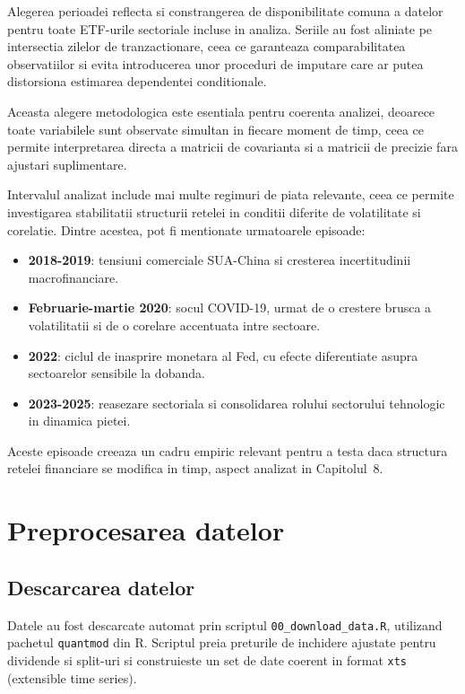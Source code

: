 Alegerea perioadei reflecta si constrangerea de disponibilitate comuna a datelor pentru toate ETF-urile sectoriale incluse in analiza. Seriile au fost aliniate pe intersectia zilelor de tranzactionare, ceea ce garanteaza comparabilitatea observatiilor si evita introducerea unor proceduri de imputare care ar putea distorsiona estimarea dependentei conditionale.

Aceasta alegere metodologica este esentiala pentru coerenta analizei, deoarece toate variabilele sunt observate simultan in fiecare moment de timp, ceea ce permite interpretarea directa a matricii de covarianta si a matricii de precizie fara ajustari suplimentare.

Intervalul analizat include mai multe regimuri de piata relevante, ceea ce permite investigarea stabilitatii structurii retelei in conditii diferite de volatilitate si corelatie. Dintre acestea, pot fi mentionate urmatoarele episoade:

\begin{itemize}
    \item \textbf{2018-2019}: tensiuni comerciale SUA-China si cresterea incertitudinii macrofinanciare.
    \item \textbf{Februarie-martie 2020}: socul COVID-19, urmat de o crestere brusca a volatilitatii si de o corelare accentuata intre sectoare.
    \item \textbf{2022}: ciclul de inasprire monetara al Fed, cu efecte diferentiate asupra sectoarelor sensibile la dobanda.
    \item \textbf{2023-2025}: reasezare sectoriala si consolidarea rolului sectorului tehnologic in dinamica pietei.
\end{itemize}

Aceste episoade creeaza un cadru empiric relevant pentru a testa daca structura retelei financiare se modifica in timp, aspect analizat in Capitolul~8.

\section{Preprocesarea datelor}

\subsection{Descarcarea datelor}

Datele au fost descarcate automat prin scriptul \texttt{00\_download\_data.R},
utilizand pachetul \texttt{quantmod} \citep{ryan2024} din R. Scriptul preia
preturile de inchidere ajustate pentru dividende si split-uri si construieste
un set de date coerent in format \texttt{xts} (extensible time series).

